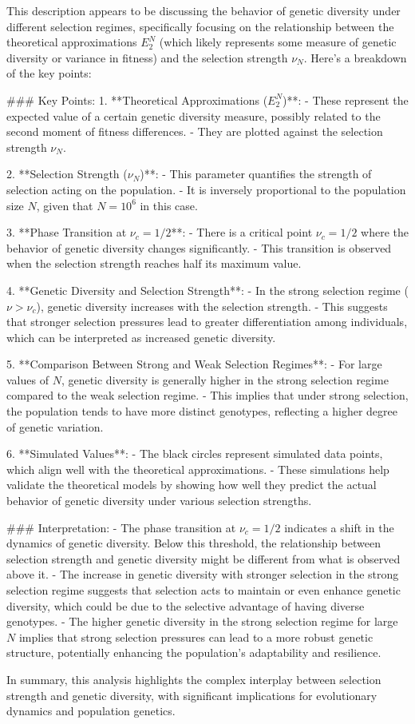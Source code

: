 This description appears to be discussing the behavior of genetic diversity under different selection regimes, specifically focusing on the relationship between the theoretical approximations \(E^N_2\) (which likely represents some measure of genetic diversity or variance in fitness) and the selection strength \(\nu_N\). Here's a breakdown of the key points:

### Key Points:
1. **Theoretical Approximations (\(E^N_2\))**:
   - These represent the expected value of a certain genetic diversity measure, possibly related to the second moment of fitness differences.
   - They are plotted against the selection strength \(\nu_N\).

2. **Selection Strength (\(\nu_N\))**:
   - This parameter quantifies the strength of selection acting on the population.
   - It is inversely proportional to the population size \(N\), given that \(N = 10^6\) in this case.

3. **Phase Transition at \(\nu_c = 1/2\)**:
   - There is a critical point \(\nu_c = 1/2\) where the behavior of genetic diversity changes significantly.
   - This transition is observed when the selection strength reaches half its maximum value.

4. **Genetic Diversity and Selection Strength**:
   - In the strong selection regime (\(\nu > \nu_c\)), genetic diversity increases with the selection strength.
   - This suggests that stronger selection pressures lead to greater differentiation among individuals, which can be interpreted as increased genetic diversity.

5. **Comparison Between Strong and Weak Selection Regimes**:
   - For large values of \(N\), genetic diversity is generally higher in the strong selection regime compared to the weak selection regime.
   - This implies that under strong selection, the population tends to have more distinct genotypes, reflecting a higher degree of genetic variation.

6. **Simulated Values**:
   - The black circles represent simulated data points, which align well with the theoretical approximations.
   - These simulations help validate the theoretical models by showing how well they predict the actual behavior of genetic diversity under various selection strengths.

### Interpretation:
- The phase transition at \(\nu_c = 1/2\) indicates a shift in the dynamics of genetic diversity. Below this threshold, the relationship between selection strength and genetic diversity might be different from what is observed above it.
- The increase in genetic diversity with stronger selection in the strong selection regime suggests that selection acts to maintain or even enhance genetic diversity, which could be due to the selective advantage of having diverse genotypes.
- The higher genetic diversity in the strong selection regime for large \(N\) implies that strong selection pressures can lead to a more robust genetic structure, potentially enhancing the population's adaptability and resilience.

In summary, this analysis highlights the complex interplay between selection strength and genetic diversity, with significant implications for evolutionary dynamics and population genetics.